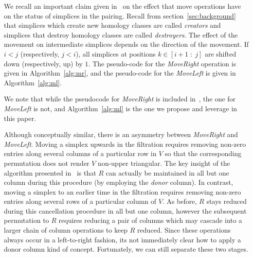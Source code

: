 \documentclass{siamart190516}
\begin{document}
\noindent
We recall an important claim given in~\cite{busaryev2010tracking} on the effect that move operations have on the status of simplices in the pairing. Recall from section~\ref{sec:background} that simplices which create new homology classes are called \emph{creators} and simplices that destroy homology classes are called \emph{destroyers}.
\noindent The effect of the movement on intermediate simplices depends on the direction of the movement. If $i < j$ (respectively, $j < i$), all simplices at positions $k \in [i+1\;:\;j] $ are shifted down (respectively, up) by $1$. 
The pseudo-code for the \emph{MoveRight} operation is given in Algorithm~\ref{alg:mr}, and the pseudo-code for the \emph{MoveLeft} is given in Algorithm~\ref{alg:ml}. 

\begin{remark}
We note that while the pseudocode for \emph{MoveRight} is included in~\cite{busaryev2010tracking}, the one for \emph{MoveLeft} is not, and Algorithm~\ref{alg:ml} is the one we propose and leverage in this paper.
\end{remark}


Although conceptually similar, there is an asymmetry between \emph{MoveRight} and \emph{MoveLeft}. Moving a simplex upwards in the filtration requires removing non-zero entries along several columns of a particular row in $V$ so that the corresponding permutation does not render $V$ non-upper triangular. The key insight of the algorithm presented in~\cite{busaryev2010tracking} is that $R$ can actually be maintained in all but one column during this procedure (by employing the \emph{donor} column). In contrast, moving a simplex to an earlier time in the filtration requires removing non-zero entries along several rows of a particular column of $V$. As before, $R$ stays reduced during this cancellation procedure in all but one column, however the subsequent permutation to $R$ requires reducing a pair of columns which may cascade into a larger chain of column operations to keep $R$ reduced. Since these operations always occur in a left-to-right fashion, its not immediately clear how to apply a donor column kind of concept. Fortunately, we can still separate  these two stages. 
\end{document}
